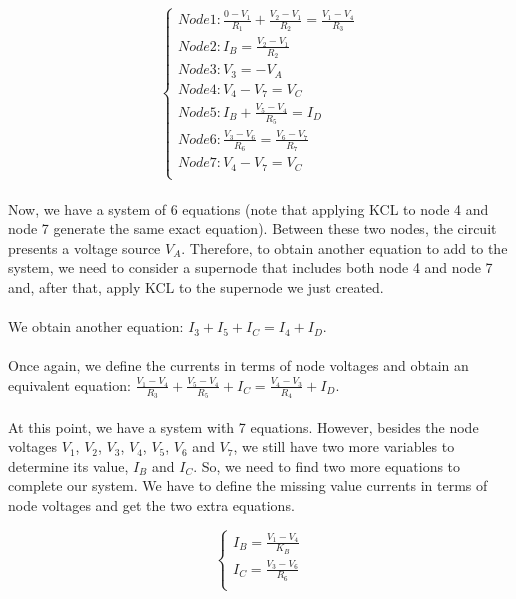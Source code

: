 \[
\left\{\begin{matrix}
Node 1: \frac{0-V_1}{R_1}+\frac{V_2-V_1}{R_2}=\frac{V_1-V_4}{R_3}\\
Node 2: I_B=\frac{V_2-V_1}{R_2}\\
Node 3: V_3=-V_A\\
Node 4: V_4 - V_7 = V_C\\
Node 5: I_B+\frac{V_5-V_4}{R_5}=I_D\\
Node 6: \frac{V_3-V_6}{R_6}=\frac{V_6-V_7}{R_7}\\
Node 7: V_4 - V_7 = V_C\\
\end{matrix}\right.
\]

\paragraph{}
Now, we have a system of 6 equations (note that applying KCL to node 4 and node 7 generate the same exact equation). Between these two nodes, the circuit presents a voltage source $V_A$. Therefore, to obtain another equation to add to the system, we need to consider a supernode that includes both node 4 and node 7 and, after that, apply KCL to the supernode we just created.

\paragraph{}
We obtain another equation: $ I_3 + I_5 + I_C = I_4 + I_D $.

\paragraph{}
Once again, we define the currents in terms of node voltages and obtain an equivalent equation: $ \frac{V_1-V_4}{R_3}+\frac{V_5-V_4}{R_5}+I_C = \frac{V_4-V_3}{R_4} + I_D $.

\paragraph{}
At this point, we have a system with 7 equations. However, besides the node voltages $V_1$, $V_2$, $V_3$, $V_4$, $V_5$, $V_6$ and $V_7$, we still have two more variables to determine its value, $I_B$ and $I_C$. So, we need to find two more equations to complete our system. We have to define the missing value currents in terms of node voltages and get the two extra equations.

\[
\left\{\begin{matrix}
I_B = \frac{V_1-V_4}{K_B} \\
I_C = \frac{V_3-V_6}{R_6} \\
\end{matrix}\right.
\]

